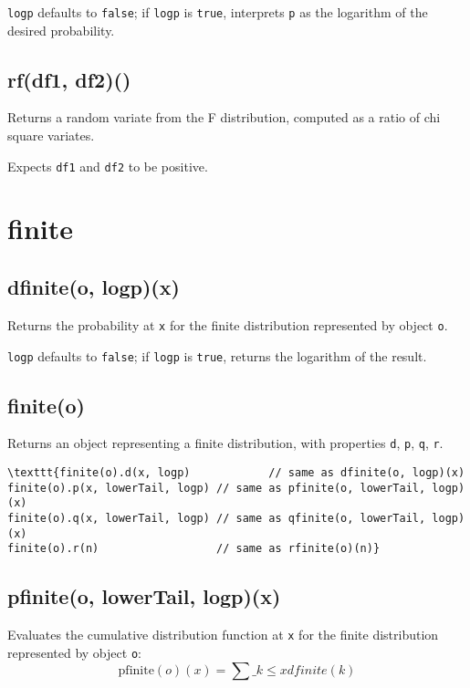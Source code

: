 \documentclass{article}
\begin{document}
\texttt{logp} defaults to \texttt{false}; if \texttt{logp} is \texttt{true}, interprets \texttt{p} as
the logarithm of the desired probability.


    \subsection*{rf(df1, df2)()}
    Returns a random variate from the F distribution, computed as a ratio
of chi square variates.


Expects \texttt{df1} and \texttt{df2} to be positive.


  \section{finite}
    \subsection*{dfinite(o, logp)(x)}
    Returns the probability at \texttt{x} for the finite distribution
represented by object \texttt{o}.


\texttt{logp} defaults to \texttt{false}; if \texttt{logp} is \texttt{true}, returns the
logarithm of the result.


    \subsection*{finite(o)}
    Returns an object representing a finite distribution, with properties
\texttt{d}, \texttt{p}, \texttt{q}, \texttt{r}.


\begin{lstlisting}
\texttt{finite(o).d(x, logp)            // same as dfinite(o, logp)(x)
finite(o).p(x, lowerTail, logp) // same as pfinite(o, lowerTail, logp)(x)
finite(o).q(x, lowerTail, logp) // same as qfinite(o, lowerTail, logp)(x)
finite(o).r(n)                  // same as rfinite(o)(n)}\end{lstlisting}

    \subsection*{pfinite(o, lowerTail, logp)(x)}
    Evaluates the cumulative distribution function at \texttt{x}
for the finite distribution represented by object \texttt{o}:
$$\textrm{pfinite}(o)(x) = \sum\_{k \leq x} dfinite(k)$$
\end{document}
